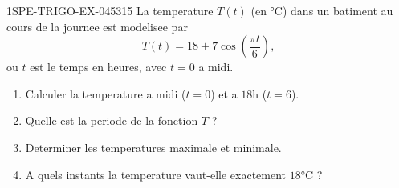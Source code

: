 \begin{exercice}{1SPE-TRIGO-EX-045}{3}{15}
La temperature $T(t)$ (en $°$C) dans un batiment au cours de la journee est modelisee par
\[
  T(t) = 18 + 7\cos\!\left(\frac{\pi t}{6}\right),
\]
ou $t$ est le temps en heures, avec $t = 0$ a midi.
\begin{enumerate}
  \item Calculer la temperature a midi ($t = 0$) et a $18$h ($t = 6$).
  \item Quelle est la periode de la fonction $T$ ?
  \item Determiner les temperatures maximale et minimale.
  \item A quels instants la temperature vaut-elle exactement $18°$C ?
\end{enumerate}
\end{exercice}
